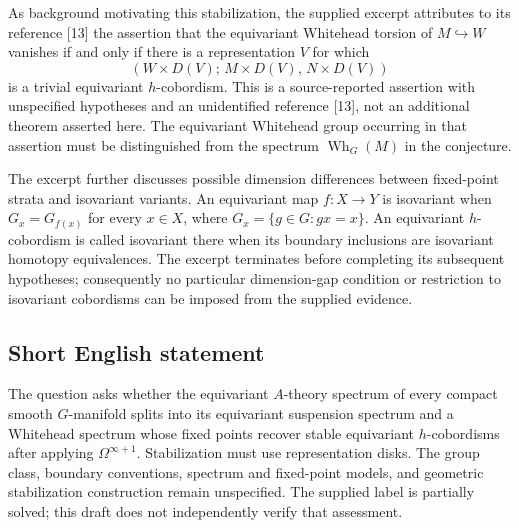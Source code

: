 \documentclass[11pt]{article}
\begin{document}
As background motivating this stabilization, the supplied excerpt attributes to its reference [13] the assertion that the equivariant Whitehead torsion of \(M\hookrightarrow W\) vanishes if and only if there is a representation \(V\) for which
\[
 (W\times D(V);\,M\times D(V),\,N\times D(V))
\]
is a trivial equivariant \(h\)-cobordism. This is a source-reported assertion with unspecified hypotheses and an unidentified reference [13], not an additional theorem asserted here. The equivariant Whitehead group occurring in that assertion must be distinguished from the spectrum \(\operatorname{Wh}_G(M)\) in the conjecture.

The excerpt further discusses possible dimension differences between fixed-point strata and isovariant variants. An equivariant map \(f:X\to Y\) is isovariant when \(G_x=G_{f(x)}\) for every \(x\in X\), where \(G_x=\{g\in G:gx=x\}\). An equivariant \(h\)-cobordism is called isovariant there when its boundary inclusions are isovariant homotopy equivalences. The excerpt terminates before completing its subsequent hypotheses; consequently no particular dimension-gap condition or restriction to isovariant cobordisms can be imposed from the supplied evidence.
\subsection{Short English statement}
The question asks whether the equivariant \(A\)-theory spectrum of every compact smooth \(G\)-manifold splits into its equivariant suspension spectrum and a Whitehead spectrum whose fixed points recover stable equivariant \(h\)-cobordisms after applying \(\Omega^{\infty+1}\). Stabilization must use representation disks. The group class, boundary conventions, spectrum and fixed-point models, and geometric stabilization construction remain unspecified. The supplied label is partially solved; this draft does not independently verify that assessment.
\end{document}
